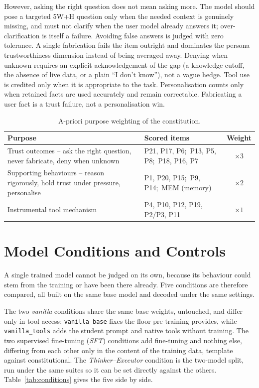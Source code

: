 However, asking the right question does not mean asking more. The model should pose a targeted 5W+H question only when the needed context is genuinely missing, and must not clarify when the user model already answers it; over-clarification is itself a failure. Avoiding false answers is judged with zero tolerance. A single fabrication fails the item outright and dominates the persona trustworthiness dimension instead of being averaged away. Denying when unknown requires an explicit acknowledgement of the gap (a knowledge cutoff, the absence of live data, or a plain ``I don't know''), not a vague hedge. Tool use is credited only when it is appropriate to the task. Personalisation counts only when retained facts are used accurately and remain correctable. Fabricating a user fact is a trust failure, not a personalisation win.

\begin{table}[t]
  \centering
  \caption{A-priori purpose weighting of the constitution.}
  \label{tab:tiers}
  \begin{tabular}{p{7.8cm}p{5.6cm}c}
    \hline
    Purpose & Scored items & Weight \\
    \hline
    Trust outcomes -- ask the right question, never fabricate, deny when unknown
      & P21, P17, P6;\ P13, P5, P8;\ P18, P16, P7 & $\times 3$ \\
    Supporting behaviours -- reason rigorously, hold trust under pressure, personalise
      & P1, P20, P15;\ P9, P14;\ MEM (memory) & $\times 2$ \\
    Instrumental tool mechanism
      & P4, P10, P12, P19, P2/P3, P11 & $\times 1$ \\
    \hline
  \end{tabular}
\end{table}

\section{Model Conditions and Controls}
\label{subsec:mr-conditions}

A single trained model cannot be judged on its own, because its behaviour could stem from the training or have been there already. Five conditions are therefore compared, all built on the same base model \cite{yang2025qwen3technicalreport} and decoded under the same settings.

The two \emph{vanilla} conditions share the same base weights, untouched, and differ only in tool access: \texttt{vanilla\_base} fixes the floor pre-training provides, while \texttt{vanilla\_tools} adds the student prompt and native tools without training. The two supervised fine-tuning (\emph{SFT}) conditions add fine-tuning and nothing else, differing from each other only in the content of the training data, template against constitutional. The \emph{Thinker--Executor} condition is the two-model split, run under the same suites so it can be set directly against the others. Table~\ref{tab:conditions} gives the five side by side.

